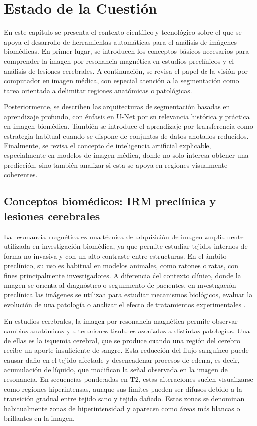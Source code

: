 \chapter{Estado de la Cuestión}
\label{cap:estadoDeLaCuestion}

En este capítulo se presenta el contexto científico y tecnológico sobre el que se apoya el desarrollo de herramientas automáticas para el análisis de imágenes biomédicas. En primer lugar, se introducen los conceptos básicos necesarios para comprender la imagen por resonancia magnética en estudios preclínicos y el análisis de lesiones cerebrales. A continuación, se revisa el papel de la visión por computador en imagen médica, con especial atención a la segmentación como tarea orientada a delimitar regiones anatómicas o patológicas.

Posteriormente, se describen las arquitecturas de segmentación basadas en aprendizaje profundo, con énfasis en U-Net por su relevancia histórica y práctica en imagen biomédica. También se introduce el aprendizaje por transferencia como estrategia habitual cuando se dispone de conjuntos de datos anotados reducidos. Finalmente, se revisa el concepto de inteligencia artificial explicable, especialmente en modelos de imagen médica, donde no solo interesa obtener una predicción, sino también analizar si esta se apoya en regiones visualmente coherentes.

\section{Conceptos biomédicos: IRM preclínica y lesiones cerebrales}

La resonancia magnética es una técnica de adquisición de imagen ampliamente utilizada en investigación biomédica, ya que permite estudiar tejidos internos de forma no invasiva y con un alto contraste entre estructuras. En el ámbito preclínico, su uso es habitual en modelos animales, como ratones o ratas, con fines principalmente investigadores. A diferencia del contexto clínico, donde la imagen se orienta al diagnóstico o seguimiento de pacientes, en investigación preclínica las imágenes se utilizan para estudiar mecanismos biológicos, evaluar la evolución de una patología o analizar el efecto de tratamientos experimentales \citep{saito2024preclinicalMRI,ucm_imagej_manual}.

En estudios cerebrales, la imagen por resonancia magnética permite observar cambios anatómicos y alteraciones tisulares asociadas a distintas patologías. Una de ellas es la isquemia cerebral, que se produce cuando una región del cerebro recibe un aporte insuficiente de sangre. Esta reducción del flujo sanguíneo puede causar daño en el tejido afectado y desencadenar procesos de edema, es decir, acumulación de líquido, que modifican la señal observada en la imagen de resonancia. En secuencias ponderadas en T2, estas alteraciones suelen visualizarse como regiones hiperintensas, aunque sus límites pueden ser difusos debido a la transición gradual entre tejido sano y tejido dañado.  Estas zonas se denominan habitualmente zonas de hiperintensidad y aparecen como áreas más blancas o brillantes en la imagen. \citep{an2023mouseStrokeSegmentation,civrny2024cerebralOedemaMRI, veigaCanuto2022interobserverMRI}

